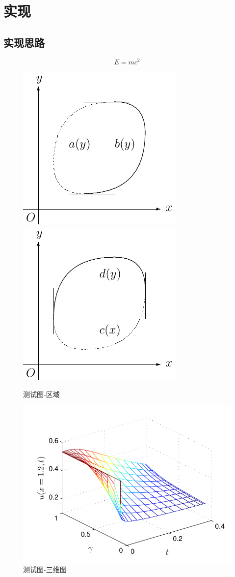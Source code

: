 \documentclass[twoside]{nputhesis}
\begin{document}
\chapter{实现}
\section{实现思路}
\begin{equation}
  E=mc^2
\end{equation}
\begin{figure}
  \centering
  \includegraphics{figures/fig1-1.pdf}
  \hskip 10pt
  \includegraphics{figures/fig1-2.pdf}
  \caption{测试图-区域}
\end{figure}
\begin{figure}
  \centering
  \includegraphics{figures/fig2.pdf}
  \caption{测试图-三维图}
\end{figure}
\end{document}

